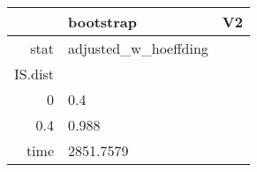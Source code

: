 \begin{table}[ht]
\centering
\begingroup\tiny
\begin{tabular}{rll}
  \hline
 & bootstrap & V2 \\ 
  \hline
stat & adjusted\_w\_hoeffding &  \\ 
  IS.dist &  &  \\ 
  0 & 0.4 &  \\ 
  0.4 & 0.988 &  \\ 
  time & 2851.7579 &  \\ 
   \hline
\end{tabular}
\endgroup
\end{table}
